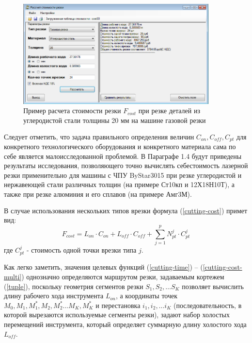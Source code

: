 \documentclass{article}
\begin{document}
\begin{figure}
  \begin{center}
  \includegraphics[width=0.9\textwidth]{cost.png}
  \caption{Пример расчета стоимости резки $F_{cost}$ при резке деталей из углеродистой стали толщины 20 мм на машине газовой резки}
  \label{cost}
  \end{center}
\end{figure}

Следует отметить,
что задача правильного определения величин
$C_{on}, C_{off}, C_{pt}$
для конкретного технологического оборудования
и конкретного материала сама по себе является малоисследованной проблемой.
В Параграфе 1.4
будут приведены результаты исследования,
позволяющего точно вычислять себестоимость
лазерной резки применительно для машины с ЧПУ
ByStar3015 при резке углеродистой и нержавеющей
стали различных толщин
(на примере Ст10кп и 12Х18Н10Т),
а также при резке алюминия и его сплавов (на примере Амг3М).

В случае использования нескольких типов врезки формула (\ref{cutting-cost}) примет вид:
\begin{equation}
  F_{cost}=
  L_{on} \cdot C_{on} +
  L_{off} \cdot C_{off} +
  \sum_{j=1}^p N_{pt}^j \cdot C_{pt}^j
  \label{cutting-cost-multi}
\end{equation}
где $C_{pt}^j$ - стоимость одной точки врезки типа $j$.

Как легко заметить,
значения целевых функций (\ref{cutting-time}) – (\ref{cutting-cost-multi})
однозначно определяются маршрутом резки, задаваемым кортежем (\ref{tuple}),
поскольку геометрия сегментов резки
$S_1, S_2, \dots S_K$
позволяет вычислить длину рабочего хода инструмента  $L_{on}$,
а координаты точек
$M_0, M_1, M_1^*, M_2, M_2^* \dots M_K, M_K^*$
и перестановка
$i_1, i_2, \dots i_K$
(последовательность, в которой вырезаются используемые сегменты резки),
задают набор холостых перемещений инструмента,
который определяет суммарную длину холостого хода  $L_{off}$.
\end{document}
